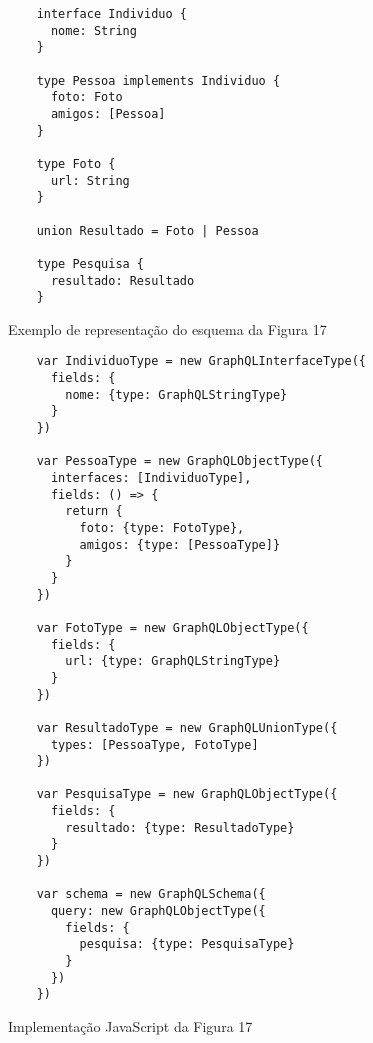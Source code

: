 \begin{figure}[H]
  \centering
  \begin{verbatim}
    interface Individuo {
      nome: String
    }

    type Pessoa implements Individuo {
      foto: Foto
      amigos: [Pessoa]
    }

    type Foto {
      url: String
    }

    union Resultado = Foto | Pessoa

    type Pesquisa {
      resultado: Resultado
    }
  \end{verbatim}
  \caption{Exemplo de representação do esquema da Figura 17}
\end{figure}

\begin{figure}[H]
  \centering
  \begin{verbatim}
    var IndividuoType = new GraphQLInterfaceType({
      fields: {
        nome: {type: GraphQLStringType}
      }
    })

    var PessoaType = new GraphQLObjectType({
      interfaces: [IndividuoType],
      fields: () => {
        return {
          foto: {type: FotoType},
          amigos: {type: [PessoaType]}
        }
      }
    })

    var FotoType = new GraphQLObjectType({
      fields: {
        url: {type: GraphQLStringType}
      }
    })

    var ResultadoType = new GraphQLUnionType({
      types: [PessoaType, FotoType]
    })

    var PesquisaType = new GraphQLObjectType({
      fields: {
        resultado: {type: ResultadoType}
      }
    })

    var schema = new GraphQLSchema({
      query: new GraphQLObjectType({
        fields: {
          pesquisa: {type: PesquisaType}
        }
      })
    })
  \end{verbatim}
  \caption{Implementação JavaScript da Figura 17}
\end{figure}
